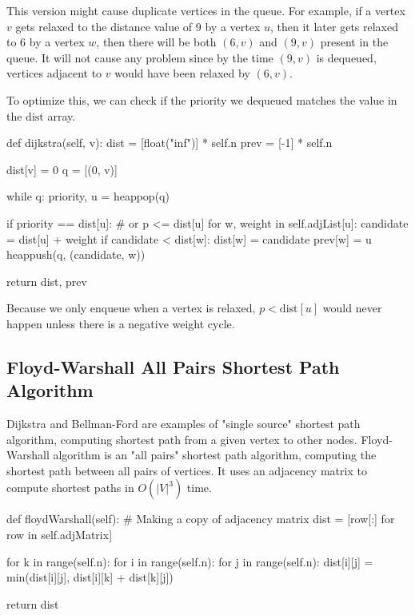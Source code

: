 \noindent This version might cause duplicate vertices in the queue.
For example, if a vertex $v$ gets relaxed to the distance value of $9$ by a vertex $u$, then it later gets relaxed to $6$ by a vertex $w$, then there will be both $(6, v)$ and $(9, v)$ present in the queue.
It will not cause any problem since by the time $(9, v)$ is dequeued, vertices adjacent to $v$ would have been relaxed by $(6, v)$.

\noindent To optimize this, we can check if the priority we dequeued matches the value in the $\textrm{dist}$ array.

\begin{python}
    def dijkstra(self, v):
        dist = [float("inf")] * self.n
        prev = [-1] * self.n

        dist[v] = 0
        q = [(0, v)]

        while q:
            priority, u = heappop(q)

            if priority == dist[u]:  # or p <= dist[u]
                for w, weight in self.adjList[u]:
                    candidate = dist[u] + weight
                    if candidate < dist[w]:
                        dist[w] = candidate
                        prev[w] = u
                        heappush(q, (candidate, w))

        return dist, prev
\end{python}

\noindent Because we only enqueue when a vertex is relaxed, $p < \textrm{dist}[u]$ would never happen unless there is a negative weight cycle.

\subsection{Floyd-Warshall All Pairs Shortest Path Algorithm}

Dijkstra and Bellman-Ford are examples of "single source" shortest path algorithm, computing shortest path from a given vertex to other nodes.
Floyd-Warshall algorithm is an "all pairs" shortest path algorithm, computing the shortest path between all pairs of vertices.
It uses an adjacency matrix to compute shortest paths in $O(|V|^3)$ time.

\begin{python}
    def floydWarshall(self):
        # Making a copy of adjacency matrix
        dist = [row[:] for row in self.adjMatrix]

        for k in range(self.n):
            for i in range(self.n):
                for j in range(self.n):
                    dist[i][j] = min(dist[i][j], dist[i][k] + dist[k][j])

        return dist
\end{python}

